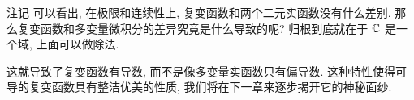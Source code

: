 \begin{frame}{注记}
\onslide<+->
可以看出, 在极限和连续性上, 复变函数和两个二元实函数没有什么差别.
\onslide<+->
那么复变函数和多变量微积分的差异究竟是什么导致的呢?
\onslide<+->
归根到底就在于 ${\mathbb{C}}$ 是一个域, 上面可以做除法.

\onslide<+->
这就导致了复变函数有\alert{导数}, 而不是像多变量实函数只有偏导数.
\onslide<+->
这种特性使得可导的复变函数具有整洁优美的性质, 我们将在下一章来逐步揭开它的神秘面纱.
\end{frame}

